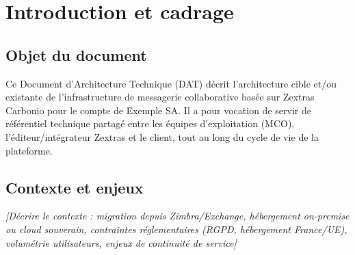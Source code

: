 \documentclass[11pt,a4paper]{report}
\newcommand{\placeholder}[1]{\textit{\textcolor{placeholdercol}{[#1]}}\par\vspace{4pt}}
\begin{document}
\clearpage
\tableofcontents
\clearpage

\renewcommand{\footrulewidth}{0.4pt}

\chapter{Introduction et cadrage}

\section{Objet du document}
Ce Document d'Architecture Technique (DAT) décrit l'architecture cible et/ou existante de l'infrastructure de messagerie collaborative basée sur Zextras Carbonio pour le compte de Exemple SA. Il a pour vocation de servir de référentiel technique partagé entre les équipes d'exploitation (MCO), l'éditeur/intégrateur Zextras et le client, tout au long du cycle de vie de la plateforme.

\section{Contexte et enjeux}
\placeholder{Décrire le contexte : migration depuis Zimbra/Exchange, hébergement on-premise ou cloud souverain, contraintes réglementaires (RGPD, hébergement France/UE), volumétrie utilisateurs, enjeux de continuité de service}
\end{document}
